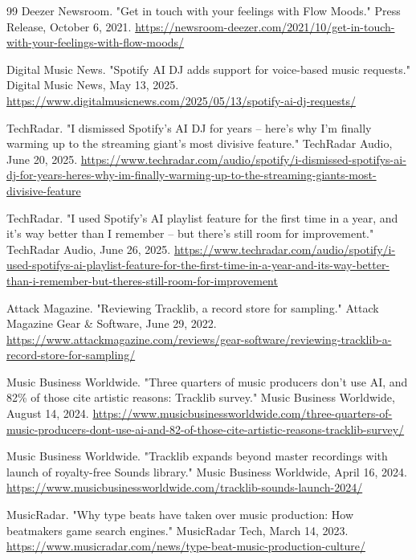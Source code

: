\begin{thebibliography}{99}
  Deezer Newsroom.
  "Get in touch with your feelings with Flow Moods."
  Press Release, October 6, 2021. \url{https://newsroom-deezer.com/2021/10/get-in-touch-with-your-feelings-with-flow-moods/}

  Digital Music News.
  "Spotify AI DJ adds support for voice-based music requests."
  Digital Music News, May 13, 2025. \url{https://www.digitalmusicnews.com/2025/05/13/spotify-ai-dj-requests/}

  TechRadar.
  "I dismissed Spotify's AI DJ for years -- here's why I'm finally warming up to the streaming giant's most divisive feature."
  TechRadar Audio, June 20, 2025. \url{https://www.techradar.com/audio/spotify/i-dismissed-spotifys-ai-dj-for-years-heres-why-im-finally-warming-up-to-the-streaming-giants-most-divisive-feature}

  TechRadar.
  "I used Spotify's AI playlist feature for the first time in a year, and it's way better than I remember -- but there's still room for improvement."
  TechRadar Audio, June 26, 2025. \url{https://www.techradar.com/audio/spotify/i-used-spotifys-ai-playlist-feature-for-the-first-time-in-a-year-and-its-way-better-than-i-remember-but-theres-still-room-for-improvement}

  Attack Magazine.
  "Reviewing Tracklib, a record store for sampling."
  Attack Magazine Gear \& Software, June 29, 2022. \url{https://www.attackmagazine.com/reviews/gear-software/reviewing-tracklib-a-record-store-for-sampling/}

  Music Business Worldwide.
  "Three quarters of music producers don't use AI, and 82\% of those cite artistic reasons: Tracklib survey."
  Music Business Worldwide, August 14, 2024. \url{https://www.musicbusinessworldwide.com/three-quarters-of-music-producers-dont-use-ai-and-82-of-those-cite-artistic-reasons-tracklib-survey/}

  Music Business Worldwide.
  "Tracklib expands beyond master recordings with launch of royalty-free Sounds library."
  Music Business Worldwide, April 16, 2024. \url{https://www.musicbusinessworldwide.com/tracklib-sounds-launch-2024/}

  MusicRadar.
  "Why type beats have taken over music production: How beatmakers game search engines."
  MusicRadar Tech, March 14, 2023. \url{https://www.musicradar.com/news/type-beat-music-production-culture/}


\end{thebibliography}
